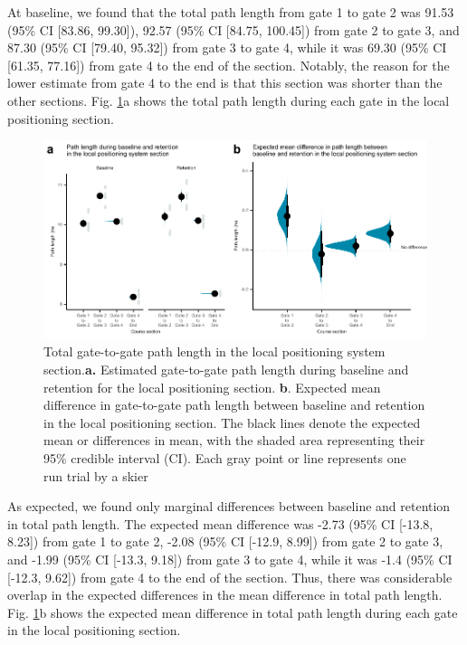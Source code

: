 \documentclass{article}
\begin{document}
At baseline, we found that the total path length from gate 1 to gate 2 was 91.53 (95\% CI [83.86, 99.30]), 92.57 (95\% CI [84.75, 100.45]) from gate 2 to gate 3, and 87.30 (95\% CI [79.40, 95.32]) from gate 3 to gate 4, while it was 69.30 (95\% CI [61.35, 77.16]) from gate 4 to the end of the section. Notably, the reason for the lower estimate from gate 4 to the end is that this section was shorter than the other sections. Fig. \ref{fig: path}a shows the total path length during each gate in the local positioning section.


\begin{figure}[H]
    \centering
    \includegraphics[width=1\linewidth]{figurer/figure_path2.pdf}
    \caption{Total gate-to-gate path length in the local positioning system section.\textbf{a.} Estimated gate-to-gate path length during baseline and retention for the local positioning section. \textbf{b}. Expected mean difference in gate-to-gate path length between baseline and retention in the local positioning section. The black lines denote the expected mean or differences in mean, with the shaded area representing their 95\% credible interval (CI). Each gray point or line represents one run trial by a skier}
    \label{fig: path}
\end{figure}

As expected, we found only marginal differences between baseline and retention in total path length. The expected mean difference was -2.73 (95\% CI [-13.8, 8.23]) from gate 1 to gate 2, -2.08 (95\% CI [-12.9, 8.99]) from gate 2 to gate 3, and -1.99 (95\% CI [-13.3, 9.18]) from gate 3 to gate 4, while it was -1.4 (95\% CI [-12.3, 9.62]) from gate 4 to the end of the section. Thus, there was considerable overlap in the expected differences in the mean difference in total path length. Fig. \ref{fig: path}b shows the expected mean difference in total path length during each gate in the local positioning section.
\end{document}
